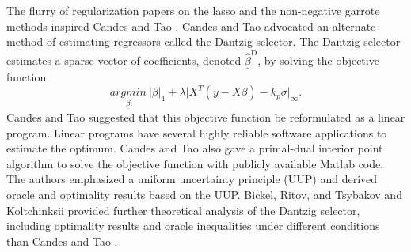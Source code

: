 The flurry of regularization papers on the lasso and the non-negative garrote methods inspired Candes and Tao \cite{candes2007dantzig}. Candes and Tao \cite{candes2007dantzig} advocated an alternate method of estimating regressors called the Dantzig selector. The Dantzig selector estimates a sparse vector of coefficients, denoted $\hat{\underline{\beta}}^{\text{D}}$, by solving the objective function
\begin{equation}\label{eqn:dantzig_sel}
\underset{\underline{\beta}}{argmin}\ \vert \underline{\beta}\vert_1 + \lambda\vert X^T(\underline{y} -X\underline{\beta}) -k_p\sigma\vert_{\infty}.
 \end{equation}
Candes and Tao \cite{candes2007dantzig} suggested that this objective function be reformulated as a linear program. Linear programs have several highly reliable software applications to estimate the optimum. Candes and Tao \cite{candes2007dantzig} also gave a primal-dual interior point algorithm to solve the objective function with publicly available Matlab code. The authors emphasized a uniform uncertainty principle (UUP) and derived oracle and optimality results based on the UUP. Bickel, Ritov, and Tsybakov \cite{bickel2009simultaneous} and Koltchinksii \cite{koltchinskii2009dantzig} provided further theoretical analysis of the Dantzig selector, including optimality results and oracle inequalities under different conditions than Candes and Tao \cite{candes2007dantzig}.

